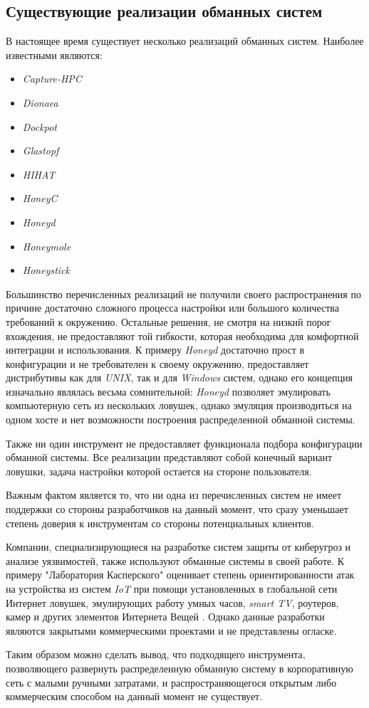 \subsection{Существующие реализации обманных систем}

В настоящее время существует несколько реализаций обманных систем. Наиболее известными являются\citep{honeynet}:
\begin{itemize}
\item \textit{Capture-HPC}
\item \textit{Dionaea}
\item \textit{Dockpot}
\item \textit{Glastopf}
\item \textit{HIHAT}
\item \textit{HoneyC}
\item \textit{Honeyd}
\item \textit{Honeymole}
\item \textit{Honeystick}
\end{itemize}

Большинство перечисленных реализаций не получили своего распространения по причине достаточно сложного процесса настройки или большого количества требований к окружению. Остальные решения, не смотря на низкий порог вхождения, не предоставляют той гибкости, которая необходима для комфортной интеграции и использования. К примеру \textit{Honeyd} достаточно прост в конфигурации и не требователен к своему окружению, предоставляет дистрибутивы как для \textit{UNIX}, так и для \textit{Windows} систем, однако его концепция изначально являлась весьма сомнительной: \textit{Honeyd} позволяет эмулировать компьютерную сеть из нескольких ловушек, однако эмуляция производиться на одном хосте и нет возможности построения распределенной обманной системы.

Также ни один инструмент не предоставляет функционала подбора конфигурации обманной системы. Все реализации представляют собой конечный вариант ловушки, задача настройки которой остается на стороне пользователя.

Важным фактом является то, что ни одна из перечисленных систем не имеет поддержки со стороны разработчиков на данный момент, что сразу уменьшает степень доверия к инструментам со стороны потенциальных клиентов.

Компании, специализирующиеся на разработке систем защиты от киберугроз и анализе уязвимостей, также используют обманные системы в своей работе. К примеру "Лаборатория Касперского" оценивает степень ориентированности атак на устройства из систем \textit{IoT} при помощи установленных в глобальной сети Интернет ловушек, эмулирующих работу умных часов, \textit{smart TV}, роутеров, камер и других элементов Интернета Вещей \citep{kaspersky}. Однако данные разработки являются закрытыми коммерческими проектами и не представлены огласке.

Таким образом можно сделать вывод, что подходящего инструмента, позволяющего развернуть распределенную обманную систему в корпоративную сеть с малыми ручными затратами, и распространяющегося открытым либо коммерческим способом на данный момент не существует.